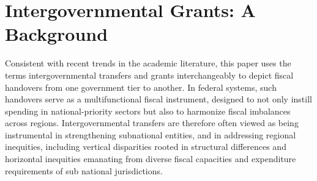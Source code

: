 


\section{Intergovernmental Grants: A Background}
Consistent with recent trends in the academic literature\parencite{abbott2012intergovernmental,akai2019role,lago2024effects}, this paper uses the terms intergovernmental transfers and grants interchangeably to depict fiscal handovers from one government tier to another. In federal systems, such handovers serve as a multifunctional fiscal instrument, designed to not only instill spending in national-priority sectors but also to harmonize fiscal imbalances across regions. Intergovernmental transfers are therefore often viewed as being instrumental in strengthening subnational entities, and in addressing regional inequities, including vertical disparities rooted in structural differences and horizontal inequities emanating from diverse fiscal capacities and expenditure requirements of sub national jurisdictions.

